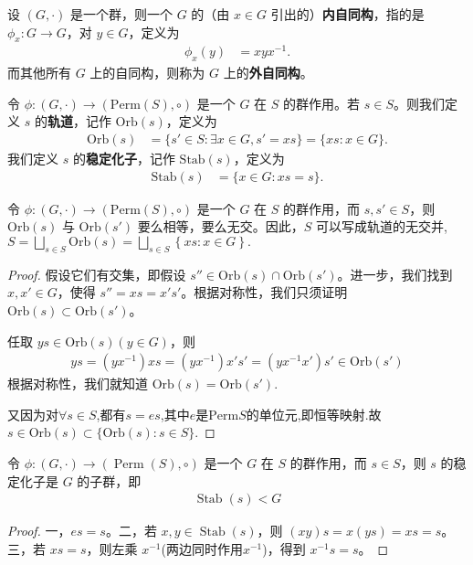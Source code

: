 \documentclass[../../main.tex]{subfiles}
\begin{document}
\begin{definition}[内自同构与外自同构]
设 \((G, \cdot)\) 是一个群，则一个 \(G\) 的（由 \(x \in G\) 引出的）\textbf{内自同构}，指的是 \(\phi_x: G \to G\)，对 \(y \in G\)，定义为
\begin{align*}
\phi_x(y) &= xyx^{-1}.
\end{align*}
而其他所有 \(G\) 上的自同构，则称为 \(G\) 上的\textbf{外自同构}。 
\end{definition}

\begin{definition}[轨道与稳定化子]
令 \(\phi: (G, \cdot) \to (\mathrm{Perm}(S), \circ)\) 是一个 \(G\) 在 \(S\) 的群作用。若 \(s \in S\)。则我们定义 \(s\) 的\textbf{轨道}，记作 \(\mathrm{Orb}(s)\)，定义为
\begin{align*}
\mathrm{Orb}(s) &= \{s' \in S : \exists x \in G, s' = xs\} = \{xs : x \in G\}.
\end{align*}
我们定义 \(s\) 的\textbf{稳定化子}，记作 \(\mathrm{Stab}(s)\)，定义为
\begin{align*}
\mathrm{Stab}(s) &= \{x \in G : xs = s\} .
\end{align*} 
\end{definition}

\begin{proposition}
令 $\phi:(G,\cdot)\to(\mathrm{Perm}(S),\circ)$ 是一个 $G$ 在 $S$ 的群作用，而 $s,s'\in S$，则 $\mathrm{Orb}(s)$ 与 $\mathrm{Orb}(s')$ 要么相等，要么无交。因此，$S$ 可以写成轨道的无交并,$S=\bigsqcup_{s\in S}{\mathrm{Orb}\left( s \right)}=\bigsqcup_{s\in S}{\left\{ xs:x\in G \right\}}.$
\end{proposition}
\begin{proof}
假设它们有交集，即假设 $s''\in\mathrm{Orb}(s)\cap\mathrm{Orb}(s')$。进一步，我们找到 $x,x'\in G$，使得 $s'' = xs = x's'$。根据对称性，我们只须证明 $\mathrm{Orb}(s)\subset\mathrm{Orb}(s')$。

任取 $ys\in\mathrm{Orb}(s)(y\in G)$，则
\begin{align*}
ys=(yx^{-1})xs=(yx^{-1})x's'=(yx^{-1}x')s'\in\mathrm{Orb}(s')
\end{align*}
根据对称性，我们就知道 $\mathrm{Orb}(s)=\mathrm{Orb}(s')$.

又因为对$\forall s\in S$,都有$s=es$,其中$e$是$\mathrm{Perm}{S}$的单位元,即恒等映射.故$s\in \mathrm{Orb}(s) \subset \{\mathrm{Orb}(s):s\in S\}$.
\end{proof}

\begin{proposition}
令 $\phi:(G,\cdot)\to (\operatorname{Perm}(S),\circ)$ 是一个 $G$ 在 $S$ 的群作用，而 $s\in S$，则 $s$ 的稳定化子是 $G$ 的子群，即
\begin{align*}
\operatorname{Stab}(s)<G
\end{align*}
\end{proposition}
\begin{proof}
一，$es = s$。二，若 $x,y\in \operatorname{Stab}(s)$，则 $(xy)s = x(ys)=xs = s$。三，若 $xs = s$，则左乘 $x^{-1}$(两边同时作用$x^{-1}$)，得到 $x^{-1}s = s$。 
\end{proof}
\end{document}
